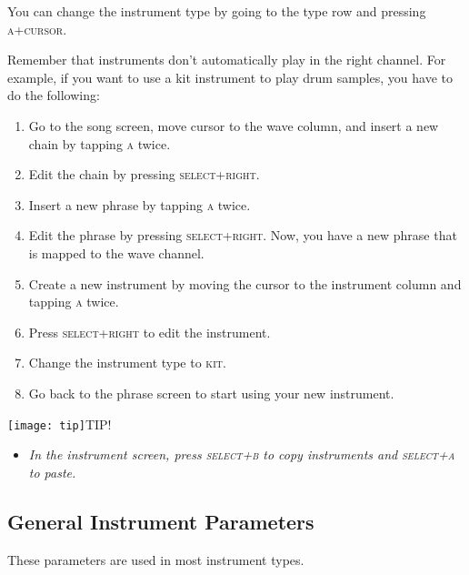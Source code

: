 You can change the instrument type by going to the type row and pressing \textsc{a+cursor}.

Remember that instruments don't automatically play in the right channel. For example, if you want to use a kit instrument to play drum samples, you have to do the following:

\begin{enumerate}
\item Go to the song screen, move cursor to the wave column, and insert a new chain by tapping \textsc{a} twice.
\item	Edit the chain by pressing \textsc{select+right}.
\item	Insert a new phrase by tapping \textsc{a} twice.
\item	Edit the phrase by pressing \textsc{select+right}. Now, you have a new phrase that is mapped to the wave channel.
\item	Create a new instrument by moving the cursor to the instrument column and tapping \textsc{a} twice.
\item	Press \textsc{select+right} to edit the instrument.
\item	Change the instrument type to \textsc{kit}.
\item	Go back to the phrase screen to start using your new instrument.
\end{enumerate}

\texttt{[image: tip]}TIP!
\begin{itemize}
	\item \textit{In the instrument screen, press \textsc{select+b} to copy instruments and \textsc{select+a} to paste.}
\end{itemize}

\subsection{General Instrument Parameters}

These parameters are used in most instrument types.

